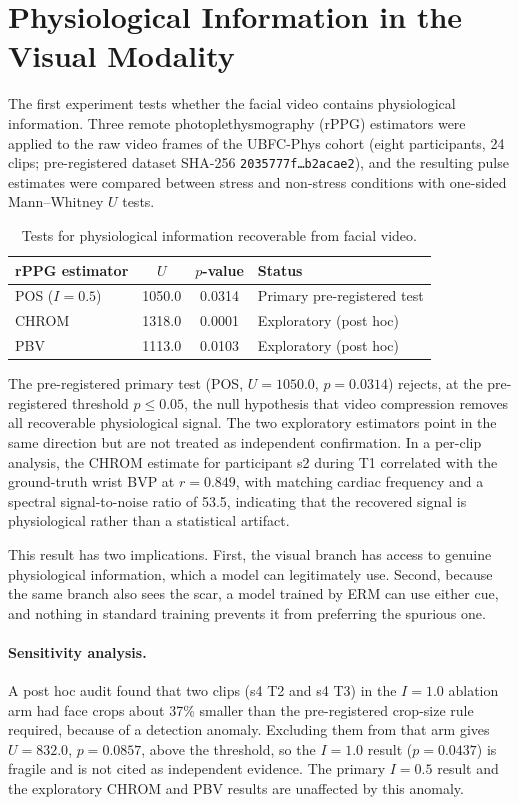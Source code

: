 \section{Physiological Information in the Visual Modality}
The first experiment tests whether the facial video contains physiological information. Three remote photoplethysmography (rPPG) estimators were applied to the raw video frames of the UBFC-Phys cohort (eight participants, 24 clips; pre-registered dataset SHA-256 \texttt{2035777f\ldots b2acae2}), and the resulting pulse estimates were compared between stress and non-stress conditions with one-sided Mann--Whitney $U$ tests.

\begin{table}[htbp]
\centering
\begin{tabular}{@{}lccl@{}}
\toprule
\textbf{rPPG estimator} & \textbf{$U$} & \textbf{$p$-value} & \textbf{Status} \\
\midrule
POS ($I = 0.5$) & 1050.0 & 0.0314 & Primary pre-registered test \\
CHROM & 1318.0 & 0.0001 & Exploratory (post hoc) \\
PBV & 1113.0 & 0.0103 & Exploratory (post hoc) \\
\bottomrule
\end{tabular}
\caption{Tests for physiological information recoverable from facial video.}
\label{tab:leakage}
\end{table}

The pre-registered primary test (POS, $U = 1050.0$, $p = 0.0314$) rejects, at the pre-registered threshold $p \le 0.05$, the null hypothesis that video compression removes all recoverable physiological signal. The two exploratory estimators point in the same direction but are not treated as independent confirmation. In a per-clip analysis, the CHROM estimate for participant s2 during T1 correlated with the ground-truth wrist BVP at $r = 0.849$, with matching cardiac frequency and a spectral signal-to-noise ratio of 53.5, indicating that the recovered signal is physiological rather than a statistical artifact.

This result has two implications. First, the visual branch has access to genuine physiological information, which a model can legitimately use. Second, because the same branch also sees the scar, a model trained by ERM can use either cue, and nothing in standard training prevents it from preferring the spurious one.

\paragraph{Sensitivity analysis.} A post hoc audit found that two clips (s4 T2 and s4 T3) in the $I = 1.0$ ablation arm had face crops about 37\% smaller than the pre-registered crop-size rule required, because of a detection anomaly. Excluding them from that arm gives $U = 832.0$, $p = 0.0857$, above the threshold, so the $I = 1.0$ result ($p = 0.0437$) is fragile and is not cited as independent evidence. The primary $I = 0.5$ result and the exploratory CHROM and PBV results are unaffected by this anomaly.

